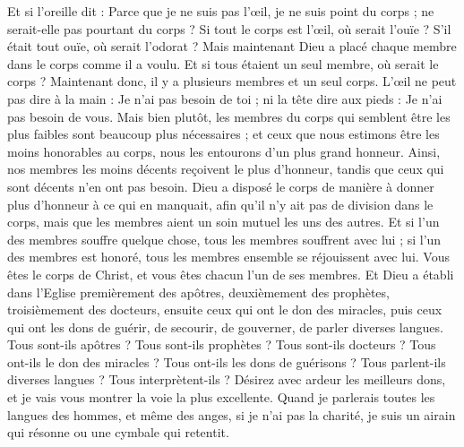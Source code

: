 \begin{multicols}{2}
Et si l'oreille dit : Parce que je ne suis pas l’œil, je ne suis point du corps ; ne serait-elle pas pourtant du corps ?
Si tout le corps est l’œil, où serait l'ouïe ? S’il était tout ouïe, où serait l'odorat ?
Mais maintenant Dieu a placé chaque membre dans le corps comme il a voulu.
Et si tous étaient un seul membre, où serait le corps ?
Maintenant donc, il y a plusieurs membres et un seul corps.
L’œil ne peut pas dire à la main : Je n'ai pas besoin de toi ; ni la tête dire aux pieds : Je n'ai pas besoin de vous.
Mais bien plutôt, les membres du corps qui semblent être les plus faibles sont beaucoup plus nécessaires ;
et ceux que nous estimons être les moins honorables au corps, nous les entourons d’un plus grand honneur. Ainsi, nos membres les moins décents reçoivent le plus d’honneur,
tandis que ceux qui sont décents n’en ont pas besoin. Dieu a disposé le corps de manière à donner plus d’honneur à ce qui en manquait,
afin qu'il n'y ait pas de division dans le corps, mais que les membres aient un soin mutuel les uns des autres.
Et si l'un des membres souffre quelque chose, tous les membres souffrent avec lui ; si l'un des membres est honoré, tous les membres ensemble se réjouissent avec lui.
Vous êtes le corps de Christ, et vous êtes chacun l’un de ses membres.
Et Dieu a établi dans l'Eglise premièrement des apôtres, deuxièmement des prophètes, troisièmement des docteurs, ensuite ceux qui ont le don des miracles, puis ceux qui ont les dons de guérir, de secourir, de gouverner, de parler diverses langues.
Tous sont-ils apôtres ? Tous sont-ils prophètes ? Tous sont-ils docteurs ? Tous ont-ils le don des miracles ?
Tous ont-ils les dons de guérisons ? Tous parlent-ils diverses langues ? Tous interprètent-ils ?
Désirez avec ardeur les meilleurs dons, et je vais vous montrer la voie la plus excellente.
\VerseOne{}Quand je parlerais toutes les langues des hommes, et même des anges, si je n'ai pas la charité, je suis un airain qui résonne ou une cymbale qui retentit.

\end{multicols}
